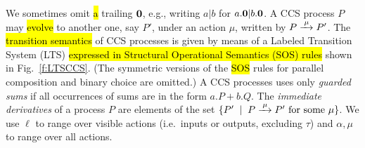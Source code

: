 We sometimes omit \hl{a} trailing ${\boldsymbol 0}$, e.g., writing $a|b$ for $a.{\boldsymbol 0} |b .{\boldsymbol 0}$.
A CCS process $P$ may \hl{evolve} to another one, say $P'$, under
  an action $\mu$, written by $P \arr{\mu} P'$.
The \hl{transition semantics} of CCS processes is given by means of
a Labeled Transition System (LTS) \hl{expressed in Structural Operational
Semantics (SOS) rules} shown in Fig.~\ref{f:LTSCCS}.
(The symmetric versions of the \hl{SOS} rules for
parallel composition and binary choice are omitted.)
A CCS processes uses only \emph{guarded sums} if all occurrences of
sums are in the form $a.P + b.Q$. 
 The \emph{immediate derivatives} of a
process $P$ are elements of the set $\{P' \st P \arr\mu P' \mbox{
  for some $\mu$}\}$.
We use $\ell$ to range over
visible actions (i.e.~inputs or outputs, excluding  $\tau$)
and $\alpha, \mu$  to range over all actions.
